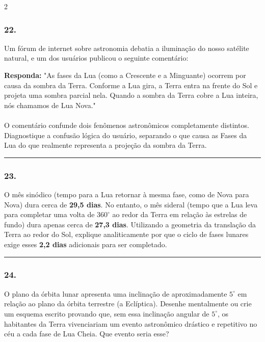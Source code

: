 \documentclass[twoside, 10pt, a4paper]{article}
\newlength{\espacoPreQuestao}\setlength{\espacoPreQuestao}{0.1cm}
\newlength{\espacoQuestao}\setlength{\espacoQuestao}{0.2cm}
\begin{document}
\begin{multicols*}{2}
\subsubsection*{22.} Um fórum de internet sobre astronomia debatia a iluminação do nosso satélite natural, e um dos usuários publicou o seguinte comentário:

\begin{boxresponda}
\textbf{Responda:} "As fases da Lua (como a Crescente e a Minguante) ocorrem por causa da sombra da Terra. Conforme a Lua gira, a Terra entra na frente do Sol e projeta uma sombra parcial nela. Quando a sombra da Terra cobre a Lua inteira, nós chamamos de Lua Nova."\\
\\
O comentário confunde dois fenômenos astronômicos completamente distintos. Diagnostique a confusão lógica do usuário, separando o que causa as Fases da Lua do que realmente representa a projeção da sombra da Terra.
\end{boxresponda}
\par\vspace{\espacoQuestao}

\noindent\textcolor{CorLinha}{\rule{\linewidth}{0.5pt}} 
\par\vspace{\espacoPreQuestao}
\subsubsection*{23.} O mês sinódico (tempo para a Lua retornar à mesma fase, como de Nova para Nova) dura cerca de \textbf{29,5 dias}. No entanto, o mês sideral (tempo que a Lua leva para completar uma volta de $360^\circ$ ao redor da Terra em relação às estrelas de fundo) dura apenas cerca de \textbf{27,3 dias}. Utilizando a geometria da translação da Terra ao redor do Sol, explique analiticamente por que o ciclo de fases lunares exige esses \textbf{2,2 dias} adicionais para ser completado.
\par\vspace{\espacoQuestao}

\noindent\textcolor{CorLinha}{\rule{\linewidth}{0.5pt}} 
\par\vspace{\espacoPreQuestao}
\subsubsection*{24.} O plano da órbita lunar apresenta uma inclinação de aproximadamente $5^\circ$ em relação ao plano da órbita terrestre (a Eclíptica). Desenhe mentalmente ou crie um esquema escrito provando que, sem essa inclinação angular de $5^\circ$, os habitantes da Terra vivenciariam um evento astronômico drástico e repetitivo no céu a cada fase de Lua Cheia. Que evento seria esse?
\par\vspace{\espacoQuestao}


\end{multicols*}
\end{document}
